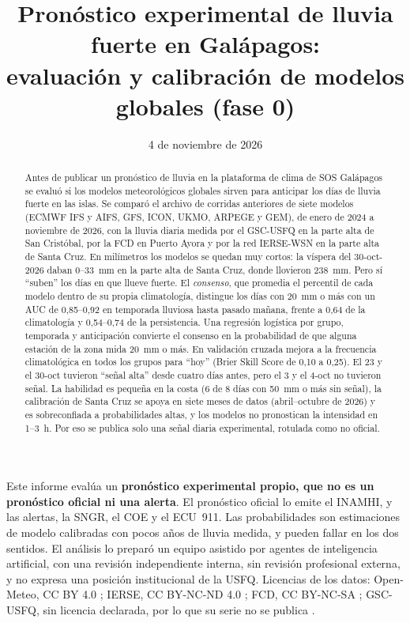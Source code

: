 \documentclass{sosg-informe}
\title{Pronóstico experimental de lluvia fuerte en Galápagos:\\evaluación y calibración de modelos globales (fase 0)}
\date{4 de noviembre de 2026}
\begin{document}
\maketitle

\begin{abstract}
Antes de publicar un pronóstico de lluvia en la plataforma de clima de SOS Galápagos se evaluó si los modelos meteorológicos globales sirven para anticipar los días de lluvia fuerte en las islas. Se comparó el archivo de corridas anteriores de siete modelos (ECMWF IFS y AIFS, GFS, ICON, UKMO, ARPEGE y GEM), de enero de 2024 a noviembre de 2026, con la lluvia diaria medida por el GSC-USFQ en la parte alta de San Cristóbal, por la FCD en Puerto Ayora y por la red IERSE-WSN en la parte alta de Santa Cruz. En milímetros los modelos se quedan muy cortos: la víspera del 30-oct-2026 daban 0--33~mm en la parte alta de Santa Cruz, donde llovieron 238~mm. Pero sí \enquote{suben} los días en que llueve fuerte. El \emph{consenso}, que promedia el percentil de cada modelo dentro de su propia climatología, distingue los días con 20~mm o más con un AUC de 0,85--0,92 en temporada lluviosa hasta pasado mañana, frente a 0,64 de la climatología y 0,54--0,74 de la persistencia. Una regresión logística por grupo, temporada y anticipación convierte el consenso en la probabilidad de que alguna estación de la zona mida 20~mm o más. En validación cruzada mejora a la frecuencia climatológica en todos los grupos para \enquote{hoy} (Brier Skill Score de 0,10 a 0,25). El 23 y el 30-oct tuvieron \enquote{señal alta} desde cuatro días antes, pero el 3 y el 4-oct no tuvieron señal. La habilidad es pequeña en la costa (6 de 8 días con 50~mm o más sin señal), la calibración de Santa Cruz se apoya en siete meses de datos (abril--octubre de 2026) y es sobreconfiada a probabilidades altas, y los modelos no pronostican la intensidad en 1--3~h. Por eso se publica solo una señal diaria experimental, rotulada como no oficial.
\end{abstract}

\begin{aviso}
Este informe evalúa un \textbf{pronóstico experimental propio, que no es un pronóstico oficial ni una alerta}. El pronóstico oficial lo emite el INAMHI, y las alertas, la SNGR, el COE y el ECU~911. Las probabilidades son estimaciones de modelo calibradas con pocos años de lluvia medida, y pueden fallar en los dos sentidos. El análisis lo preparó un equipo asistido por agentes de inteligencia artificial, con una revisión independiente interna, sin revisión profesional externa, y no expresa una posición institucional de la USFQ. Licencias de los datos: Open-Meteo, CC BY 4.0 \citep{zippenfenig2023}; IERSE, CC BY-NC-ND 4.0 \citep{ierse2023}; FCD, CC BY-NC-SA \citep{fcd2026}; GSC-USFQ, sin licencia declarada, por lo que su serie no se publica \citep[;][]{gsc2026}.
\end{aviso}
\end{document}
